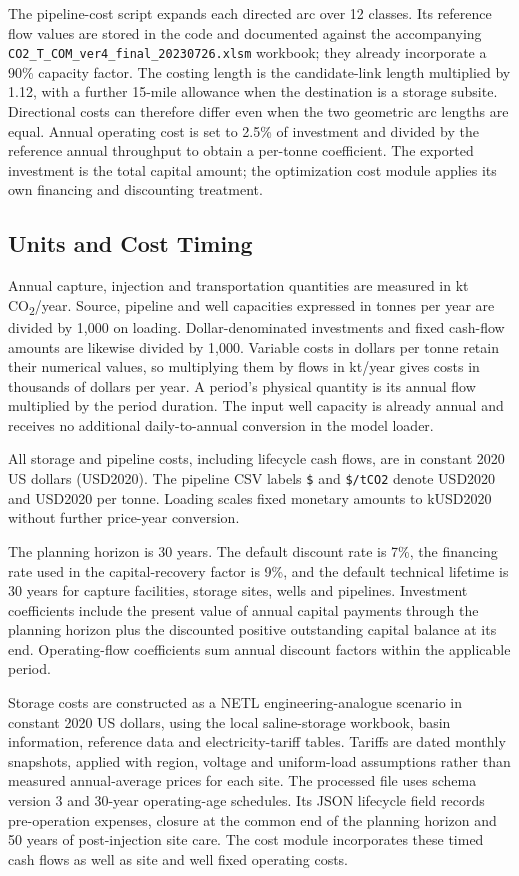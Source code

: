 \documentclass[11pt,letterpaper]{article}
\newcommand{\co}{CO\textsubscript{2}}
\newcommand{\file}[1]{\texttt{\small\nolinkurl{#1}}}
\begin{document}
The pipeline-cost script expands each directed arc over 12 classes. Its reference flow values are stored in the code and documented against the accompanying \file{CO2_T_COM_ver4_final_20230726.xlsm} workbook; they already incorporate a 90\% capacity factor. The costing length is the candidate-link length multiplied by 1.12, with a further 15-mile allowance when the destination is a storage subsite. Directional costs can therefore differ even when the two geometric arc lengths are equal. Annual operating cost is set to 2.5\% of investment and divided by the reference annual throughput to obtain a per-tonne coefficient. The exported investment is the total capital amount; the optimization cost module applies its own financing and discounting treatment.

\subsection{Units and Cost Timing}

Annual capture, injection and transportation quantities are measured in kt \co/year. Source, pipeline and well capacities expressed in tonnes per year are divided by 1,000 on loading. Dollar-denominated investments and fixed cash-flow amounts are likewise divided by 1,000. Variable costs in dollars per tonne retain their numerical values, so multiplying them by flows in kt/year gives costs in thousands of dollars per year. A period's physical quantity is its annual flow multiplied by the period duration. The input well capacity is already annual and receives no additional daily-to-annual conversion in the model loader.

All storage and pipeline costs, including lifecycle cash flows, are in constant 2020 US dollars (USD2020). The pipeline CSV labels \texttt{\$} and \texttt{\$/tCO2} denote USD2020 and USD2020 per tonne. Loading scales fixed monetary amounts to kUSD2020 without further price-year conversion.

The planning horizon is 30 years. The default discount rate is 7\%, the financing rate used in the capital-recovery factor is 9\%, and the default technical lifetime is 30 years for capture facilities, storage sites, wells and pipelines. Investment coefficients include the present value of annual capital payments through the planning horizon plus the discounted positive outstanding capital balance at its end. Operating-flow coefficients sum annual discount factors within the applicable period.

Storage costs are constructed as a NETL engineering-analogue scenario in constant 2020 US dollars, using the local saline-storage workbook, basin information, reference data and electricity-tariff tables. Tariffs are dated monthly snapshots, applied with region, voltage and uniform-load assumptions rather than measured annual-average prices for each site. The processed file uses schema version 3 and 30-year operating-age schedules. Its JSON lifecycle field records pre-operation expenses, closure at the common end of the planning horizon and 50 years of post-injection site care. The cost module incorporates these timed cash flows as well as site and well fixed operating costs.
\end{document}
